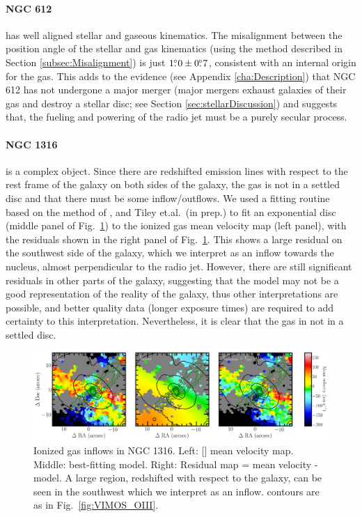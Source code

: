 	\paragraph{NGC 612} has well aligned stellar and gaseous kinematics. The misalignment between the position angle of the stellar and gas kinematics (using the method described in Section \ref{subsec:Misalignment}) is just $1\hbox{$.\!\!^\circ$}0\pm0\hbox{$.\!\!^\circ$}7$, consistent with an internal origin for the gas. This adds to the evidence (see Appendix \ref{cha:Description}) that NGC 612 has not undergone a major merger (major mergers exhaust galaxies of their gas and destroy a stellar disc; see Section \ref{sec:stellarDiscussion}) and suggests that, the fueling and powering of the radio jet must be a purely secular process. 


	\paragraph{NGC 1316} is a complex object. Since there are redshifted emission lines with respect to the rest frame of the galaxy on both sides of the galaxy, the gas is not in a settled disc and that there must be some inflow/outflows. We used a fitting routine based on the method of \citet{Swinbank2012}, \citet{Stott2016} and Tiley et.al.\ (in prep.) to fit an exponential disc (middle panel of Fig.\ \ref{fig:Inflow}) to the ionized gas mean velocity map (left panel), with the residuals shown in the right panel of Fig.\ \ref{fig:Inflow}. This shows a large residual on the southwest side of the galaxy, which we interpret as an inflow towards the nucleus, almost perpendicular to the radio jet. However, there are still significant residuals in other parts of the galaxy, suggesting that the model may not be a good representation of the reality of the galaxy, thus other interpretations are possible, and better quality data (longer exposure times) are required to add certainty to this interpretation. Nevertheless, it is clear that the gas in not in a settled disc. 

	\begin{figure}
		\centering
		\includegraphics[width=\textwidth]{chapter5/ngc1316_inflow.png}
		\caption[Inflows in NGC 1316]{Ionized gas inflows in NGC 1316. Left: [] mean velocity map. Middle: best-fitting model. Right: Residual map = mean velocity - model. A large region, redshifted with respect to the galaxy, can be seen in the southwest which we interpret as an inflow. contours are as in Fig.\ \ref{fig:VIMOS_OIII}.}
		\label{fig:Inflow}
	\end{figure}


